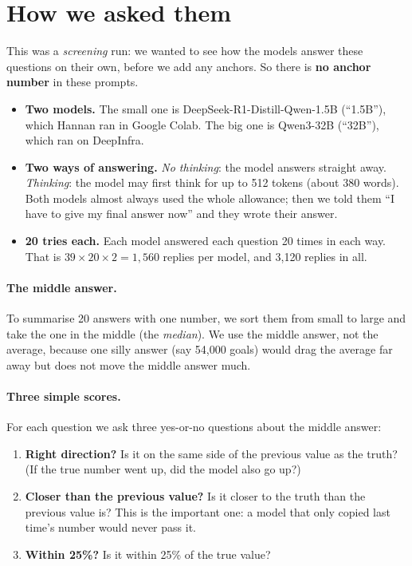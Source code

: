 \documentclass[11pt,a4paper]{article}
\begin{document}
\section{How we asked them}

This was a \emph{screening} run: we wanted to see how the models answer these questions on their own, before we add any anchors. So there is \textbf{no anchor number} in these prompts.

\begin{itemize}
  \item \textbf{Two models.} The small one is DeepSeek-R1-Distill-Qwen-1.5B (``1.5B''), which Hannan ran in Google Colab. The big one is Qwen3-32B (``32B''), which ran on DeepInfra.
  \item \textbf{Two ways of answering.} \emph{No thinking}: the model answers straight away. \emph{Thinking}: the model may first think for up to 512 tokens (about 380 words). Both models almost always used the whole allowance; then we told them ``I have to give my final answer now'' and they wrote their answer.
  \item \textbf{20 tries each.} Each model answered each question 20 times in each way. That is $39 \times 20 \times 2 = 1{,}560$ replies per model, and 3,120 replies in all.
\end{itemize}

\paragraph{The middle answer.} To summarise 20 answers with one number, we sort them from small to large and take the one in the middle (the \emph{median}). We use the middle answer, not the average, because one silly answer (say 54,000 goals) would drag the average far away but does not move the middle answer much.

\paragraph{Three simple scores.} For each question we ask three yes-or-no questions about the middle answer:
\begin{enumerate}
  \item \textbf{Right direction?} Is it on the same side of the previous value as the truth? (If the true number went up, did the model also go up?)
  \item \textbf{Closer than the previous value?} Is it closer to the truth than the previous value is? This is the important one: a model that only copied last time's number would never pass it.
  \item \textbf{Within 25\%?} Is it within 25\% of the true value?
\end{enumerate}
\end{document}
